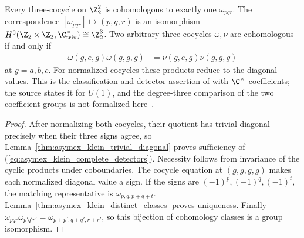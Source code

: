 \begin{lemma}
    \label{thm:asymex_klein_complete_classification}
    \leanok
    Every three-cocycle on $\Z_2^2$ is cohomologous to exactly one
    $\omega_{pqr}$. The correspondence $[\omega_{pqr}]\mapsto(p,q,r)$ is
    an isomorphism $H^3(\Z_2\times\Z_2,\C^\times_{\mathrm{triv}})\cong\Z_2^3$.
    Two arbitrary three-cocycles $\omega,\nu$ are cohomologous if and only if
    \begin{align}
        \label{eq:asymex_klein_complete_detectors}
        \omega(g,e,g)\omega(g,g,g) & =\nu(g,e,g)\nu(g,g,g)
    \end{align}
    at $g=a,b,c$. For normalized cocycles these products reduce to the
    diagonal values. This is the classification and detector assertion
    of \cite[Section~6]{GarreRubio2023MPOSym} with $\C^\times$ coefficients;
    the source states it for $U(1)$, and the degree-three comparison of the
    two coefficient groups is not formalized
    here~\cite{gap:glm23_klein_h3_circle_coefficients}.
\end{lemma}
\begin{proof}
    \leanok
    After normalizing both cocycles, their quotient has trivial diagonal
    precisely when their three signs agree, so
    Lemma~\ref{thm:asymex_klein_trivial_diagonal} proves sufficiency of
    (\ref{eq:asymex_klein_complete_detectors}). Necessity follows from
    invariance of the cyclic products under coboundaries.
    The cocycle equation at $(g,g,g,g)$ makes each normalized diagonal
    value a sign. If the signs are $(-1)^p,(-1)^q,(-1)^t$, the matching
    representative is $\omega_{p,q,p+q+t}$.
    Lemma~\ref{thm:asymex_klein_distinct_classes} proves uniqueness.
    Finally $\omega_{pqr}\omega_{p'q'r'}=\omega_{p+p',q+q',r+r'}$, so
    this bijection of cohomology classes is a group isomorphism.
\end{proof}
